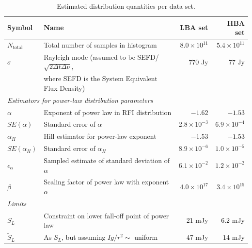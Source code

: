 \documentclass[useAMS,usenatbib]{mn2e}
\begin{document}

\begin{table}
\centering
\begin{minipage}{12cm}
\caption{Estimated distribution quantities per data set. }\label{table:dist-data-quantities}
\begin{tabular}{@{}llrr@{}}
\textbf{Symbol} & \textbf{Name} & \textbf{LBA set}& \textbf{HBA set} \\
\hline
\hline
$N_\textrm{total}$ & Total number of samples in histogram & $8.0\times10^{11}$ & $5.4\times10^{11}$ \\
$\sigma$ & Rayleigh mode (assumed to be SEFD/$\sqrt{2\Delta t \Delta \nu}$, & $770$ Jy & $77$ Jy \\
 & where SEFD is the System Equivalent Flux Density) & & \\
\hline
\multicolumn{4}{l}{\textit{Estimators for power-law distribution parameters}} \\
\hline
$\alpha$ & Exponent of power law in RFI distribution      & $-1.62$ & $-1.53$ \\ %
$SE(\alpha)$ & Standard error of $\alpha$ & $2.8 \times 10^{-3}$ & $6.9 \times 10^{-4}$ \\
$\alpha_H$ & Hill estimator for power-law exponent & $-1.53$ & $-1.53$ \\
$SE(\alpha_H)$ & Standard error of $\alpha_H$ & $8.9 \times 10^{-6}$ & $1.0\times10^{-5}$ \\
$\epsilon_{\alpha}$ & Sampled estimate of standard deviation of $\alpha$ & $6.1 \times 10^{-2}$ & $1.2 \times 10^{-2}$ \\
$\beta$ & Scaling factor of power law with exponent $\alpha$ & $4.0 \times 10^{17}$ & $3.4\times 10^{15}$ \\
\hline
\multicolumn{4}{l}{\textit{Limits}} \\
\hline
$S_L$ & Constraint on lower fall-off point of power law & $21$ mJy & $6.2$ mJy \\ %
$\tilde{S}_L$ & As $S_L$, but assuming $Ig/r^2\sim$ uniform & $47$ mJy & $14$ mJy \\ %

\end{tabular}
\end{minipage}
\end{table}
\end{document}
